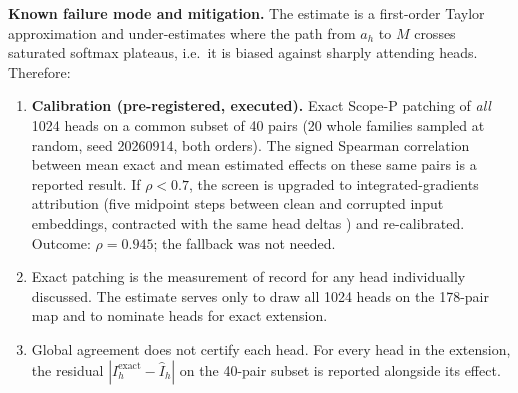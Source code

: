 \textbf{Known failure mode and mitigation.} The estimate is a first-order Taylor approximation and under-estimates where the path from $a_h$ to $M$ crosses saturated softmax plateaus, i.e.\ it is biased against sharply attending heads. Therefore:
\begin{enumerate}[itemsep=1pt]
\item \textbf{Calibration (pre-registered, executed).} Exact Scope-P patching of \emph{all} 1024 heads on a common subset of 40 pairs (20 whole families sampled at random, seed 20260914, both orders). The signed Spearman correlation between mean exact and mean estimated effects on these same pairs is a reported result. If $\rho<0.7$, the screen is upgraded to integrated-gradients attribution (five midpoint steps between clean and corrupted input embeddings, contracted with the same head deltas \cite{eapig}) and re-calibrated. Outcome: $\rho=0.945$; the fallback was not needed.
\item Exact patching is the measurement of record for any head individually discussed. The estimate serves only to draw all 1024 heads on the 178-pair map and to nominate heads for exact extension.
\item Global agreement does not certify each head. For every head in the extension, the residual $|I_h^{\text{exact}}-\hat I_h|$ on the 40-pair subset is reported alongside its effect.
\end{enumerate}

